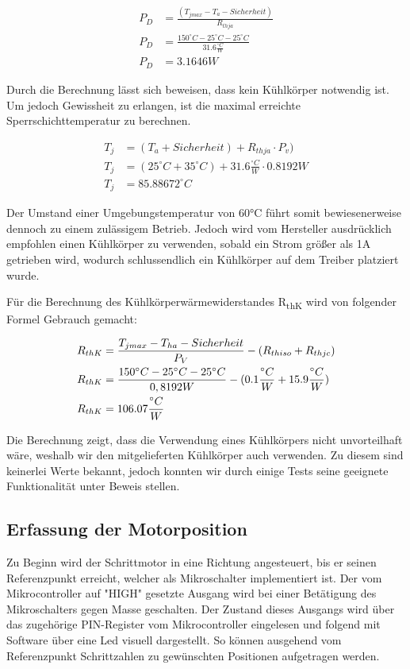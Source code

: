 \begin{align*}
    P_D &= \frac{(T_{jmax} - T_{a} - Sicherheit)}{R_{thja}} \\
    P_D &= \frac{150^{\circ}C - 25^{\circ}C - 25^{\circ}C}{31.6\frac{{}^{\circ}C}{W}} \\
    P_D &= 3.1646W
\end{align*}

Durch die Berechnung lässt sich beweisen, dass kein Kühlkörper notwendig ist.
Um jedoch Gewissheit zu erlangen, ist die maximal erreichte Sperrschichttemperatur zu berechnen.

\begin{align*}
    T_{j} &= (T_{a}+Sicherheit) + {R_{thja}} \cdot P_{v}) \\
    T_{j} &= (25^{\circ}C + 35^{\circ}C) + 31.6\frac{{}^{\circ}C}{W} \cdot 0.8192W \\
    T_{j} &= 85.88672^{\circ}C
\end{align*}

Der Umstand einer Umgebungstemperatur von 60°C führt somit bewiesenerweise dennoch zu einem zulässigem Betrieb.
Jedoch wird vom Hersteller ausdrücklich empfohlen einen Kühlkörper zu verwenden, sobald ein Strom größer als 1A getrieben wird, wodurch schlussendlich ein Kühlkörper auf dem Treiber platziert wurde.

Für die Berechnung des Kühlkörperwärmewiderstandes R\textsubscript{thK} wird von folgender Formel Gebrauch gemacht:

\begin{align}
    R_{thK} &= \frac{T_{jmax} - T_{ha} - Sicherheit}{P_V} - (R_{thiso} + R_{thjc}) \\
    R_{thK} &= \frac{150^{\circ}C - 25^{\circ}C - 25^{\circ}C}{0,8192W} - (0.1\frac{{}^{\circ}C}{W} + 15.9\frac{{}^{\circ}C}{W}) \notag \\
    R_{thK} &= 106.07\frac{{}^{\circ}C}{W}  \notag
\end{align}

Die Berechnung zeigt, dass die Verwendung eines Kühlkörpers nicht unvorteilhaft wäre, weshalb wir den mitgelieferten Kühlkörper auch verwenden.
Zu diesem sind keinerlei Werte bekannt, jedoch konnten wir durch einige Tests seine geeignete Funktionalität unter Beweis stellen.

\subsection{Erfassung der Motorposition}

Zu Beginn wird der Schrittmotor in eine Richtung angesteuert, bis er seinen Referenzpunkt erreicht, welcher als Mikroschalter implementiert ist.
Der vom Mikrocontroller auf "HIGH" gesetzte Ausgang wird bei einer Betätigung des Mikroschalters gegen Masse geschalten.
Der Zustand dieses Ausgangs wird über das zugehörige PIN-Register vom Mikrocontroller eingelesen und folgend mit Software über eine Led visuell dargestellt.
So können ausgehend vom Referenzpunkt Schrittzahlen zu gewünschten Positionen aufgetragen werden.

